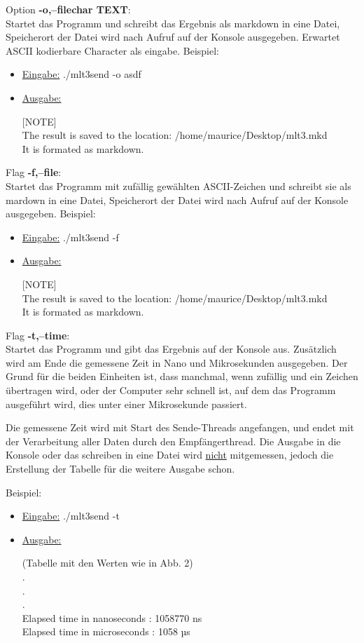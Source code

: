 \documentclass{article}
\begin{document}
Option \textbf{-o,--filechar TEXT}:\\
Startet das Programm und schreibt das Ergebnis als markdown in eine Datei, Speicherort der Datei wird nach Aufruf auf der Konsole ausgegeben.
Erwartet ASCII kodierbare Character als eingabe.
Beispiel: 
\begin{itemize}
	\item \underline{Eingabe:} ./mlt3send -o asdf
	\item \underline{Ausgabe:}

[NOTE]\\
The result is saved to the location: /home/maurice/Desktop/mlt3.mkd\\
It is formated as markdown.\\
\end{itemize}

Flag \textbf{-f,--file}:\\
Startet das Programm mit zufällig gewählten ASCII-Zeichen und schreibt sie als mardown in eine Datei, Speicherort der Datei wird nach Aufruf auf der Konsole ausgegeben.
Beispiel: 
\begin{itemize}
	\item \underline{Eingabe:} ./mlt3send -f
	\item \underline{Ausgabe:}

[NOTE]\\
The result is saved to the location: /home/maurice/Desktop/mlt3.mkd\\
It is formated as markdown.\\
\end{itemize}

Flag \textbf{-t,--time}:\\
Startet das Programm und gibt das Ergebnis auf der Konsole aus. Zusätzlich wird am Ende die gemessene Zeit in Nano und Mikrosekunden ausgegeben. Der Grund für die beiden
Einheiten ist, dass manchmal, wenn zufällig und ein Zeichen übertragen wird, oder der Computer sehr schnell ist, auf dem das Programm ausgeführt wird, dies unter
einer Mikrosekunde passiert.

Die gemessene Zeit wird mit Start des Sende-Threads angefangen, und endet mit der Verarbeitung aller Daten durch den Empfängerthread. Die Ausgabe in die Konsole oder
das schreiben in eine Datei wird \underline{nicht} mitgemessen, jedoch die Erstellung der Tabelle für die weitere Ausgabe schon.

Beispiel: 
\begin{itemize}
	\item \underline{Eingabe:} ./mlt3send -t
	\item \underline{Ausgabe:}

(Tabelle mit den Werten wie in Abb. 2)\\
.\\
.\\
.\\
Elapsed time in nanoseconds  : 1058770 ns\\
Elapsed time in microseconds : 1058 µs\\
\end{itemize}
\end{document}

